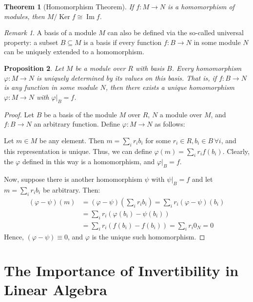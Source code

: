 \documentclass{article}
\newif\ifusemulticols
\theoremstyle{definition}
\theoremstyle{remark}
\newtheorem*{note}{Remark}
\theoremstyle{plain}
\newtheorem{theorem}{Theorem}
\theoremstyle{plain}
\newtheorem{prop}[theorem]{Proposition}
\newenvironment{mymulticols}
    { \ifusemulticols \begin{multicols}{2} \fi }
    { \ifusemulticols \end{multicols} \fi }
\DeclareMathOperator{\Ker}{Ker}
\DeclareMathOperator{\image}{Im}
\begin{document}
\begin{mymulticols}
\begin{theorem}[Homomorphism Theorem]
    If ${f : M\to N}$ is a homomorphism of modules, then $M / \Ker f \cong \image f$.
\end{theorem}

\begin{note}
    A basis of a module $M$ can also be defined via the so-called \quotedblbase universal\quotedblright{} property: a subset $B \subseteq M$ is a basis if every function $f: B \to N$ in some module $N$ can be uniquely extended to a homomorphism.
\end{note}

\begin{prop}
    \label{prop:homomorphism_univer_prop}
    Let $M$ be a module over $R$ with basis $B$. Every homomorphism $\varphi : M \to N$ is uniquely determined by its values on this basis. That is, if $f : B \to N$ is any function in some module $N$, then there exists a unique homomorphism $\varphi : M \to N$ with $\varphi\big|_B = f$.
\end{prop}

\begin{proof}
    Let $B$ be a basis of the module $M$ over $R$, $N$ a module over $M$, and $f : B \to N$ an arbitrary function.
    Define $\varphi : M \to N$ as follows:

    Let $m \in M$ be any element. Then $m = \sum_i r_i b_i$ for some $r_i \in R, b_i \in B \, \forall i$, and this representation is unique. Thus, we can define $\varphi(m) = \sum_i r_i f(b_i)$.
    Clearly, the $\varphi$ defined in this way is a homomorphism, and $\varphi\big|_B=f$.

    Now, suppose there is another homomorphism $\psi$ with $\psi\big|_B=f$ and let $m = \sum_i r_i b_i$ be arbitrary.
    Then:
    \begin{align*}
        (\varphi-\psi)(m) &= (\varphi - \psi)\left(\sum_i r_i b_i\right)
                            = \sum_i r_i (\varphi - \psi)(b_i)\\
                          &= \sum_i r_i (\varphi(b_i) - \psi(b_i))\\
                          &= \sum_i r_i (f(b_i) - f(b_i)) = \sum_i r_i 0_N = 0
    \end{align*}
    Hence, $(\varphi-\psi) \equiv 0$, and $\varphi$ is the unique such homomorphism.
\end{proof}

\section{The Importance of Invertibility in Linear Algebra}


\end{mymulticols}
\end{document}
